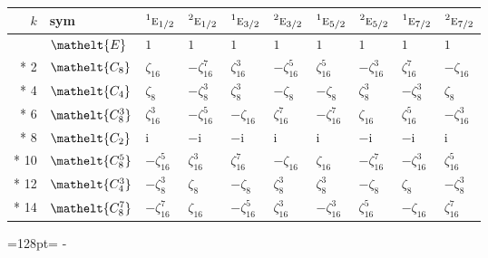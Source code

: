 \documentclass[10pt,a4paper]{article}
\newcommand{\needspace}[1]{\par\penalty-100\begingroup\dimen0=#1\relax\dimen2=\pagegoal
  \advance\dimen2-\pagetotal\ifdim\dimen0>\dimen2\relax\ifdim\dimen2>0pt\vfil\break\fi\fi
  \endgroup}
\numberwithin{equation}{section}
\newcommand{\eltfont}[1]{{\let\sigma\eltsigma\mathelt{#1}}}
\newcommand{\irr}[1]{\text{\normalfont\scshape #1}}
\newcommand{\conjpair}[1]{{}^{#1}}
\newcommand{\cls}[1]{\eltfont{#1}}
\newcommand{\iunit}{\mathrm{i}}
\newcommand{\rootunity}[1]{\zeta_{#1}}
\begin{document}
{\small\setlength{\tabcolsep}{4pt}
\begin{longtable}{@{}rlllllllll@{}}\toprule
$k$ & sym & $\conjpair{1}\irr{e}_{1/2}$ & $\conjpair{2}\irr{e}_{1/2}$ & $\conjpair{1}\irr{e}_{3/2}$ & $\conjpair{2}\irr{e}_{3/2}$ & $\conjpair{1}\irr{e}_{5/2}$ & $\conjpair{2}\irr{e}_{5/2}$ & $\conjpair{1}\irr{e}_{7/2}$ & $\conjpair{2}\irr{e}_{7/2}$\\\midrule\endhead
\bottomrule\endfoot\endlastfoot
0 & $\cls{E}$ & $1$ & $1$ & $1$ & $1$ & $1$ & $1$ & $1$ & $1$\\*
2 & $\cls{C_{8}}$ & $\rootunity{16}$ & $-\rootunity{16}^{7}$ & $\rootunity{16}^{3}$ & $-\rootunity{16}^{5}$ & $\rootunity{16}^{5}$ & $-\rootunity{16}^{3}$ & $\rootunity{16}^{7}$ & $-\rootunity{16}$\\*
4 & $\cls{C_{4}}$ & $\rootunity{8}$ & $-\rootunity{8}^{3}$ & $\rootunity{8}^{3}$ & $-\rootunity{8}$ & $-\rootunity{8}$ & $\rootunity{8}^{3}$ & $-\rootunity{8}^{3}$ & $\rootunity{8}$\\*
6 & $\cls{C_{8}^{3}}$ & $\rootunity{16}^{3}$ & $-\rootunity{16}^{5}$ & $-\rootunity{16}$ & $\rootunity{16}^{7}$ & $-\rootunity{16}^{7}$ & $\rootunity{16}$ & $\rootunity{16}^{5}$ & $-\rootunity{16}^{3}$\\*
8 & $\cls{C_{2}}$ & $\iunit{}$ & $-\iunit{}$ & $-\iunit{}$ & $\iunit{}$ & $\iunit{}$ & $-\iunit{}$ & $-\iunit{}$ & $\iunit{}$\\*
10 & $\cls{C_{8}^{5}}$ & $-\rootunity{16}^{5}$ & $\rootunity{16}^{3}$ & $\rootunity{16}^{7}$ & $-\rootunity{16}$ & $\rootunity{16}$ & $-\rootunity{16}^{7}$ & $-\rootunity{16}^{3}$ & $\rootunity{16}^{5}$\\*
12 & $\cls{C_{4}^{3}}$ & $-\rootunity{8}^{3}$ & $\rootunity{8}$ & $-\rootunity{8}$ & $\rootunity{8}^{3}$ & $\rootunity{8}^{3}$ & $-\rootunity{8}$ & $\rootunity{8}$ & $-\rootunity{8}^{3}$\\*
14 & $\cls{C_{8}^{7}}$ & $-\rootunity{16}^{7}$ & $\rootunity{16}$ & $-\rootunity{16}^{5}$ & $\rootunity{16}^{3}$ & $-\rootunity{16}^{3}$ & $\rootunity{16}^{5}$ & $-\rootunity{16}$ & $\rootunity{16}^{7}$\\
\bottomrule\end{longtable}}
\needspace{128pt}
\end{document}
